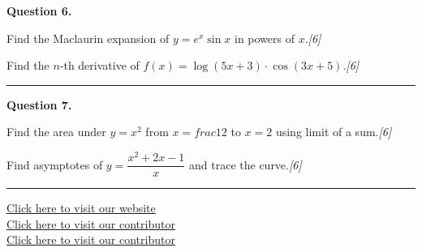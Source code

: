 \documentclass[11pt,a4paper]{article}
\newcommand{\pts}[1]{\hfill   \textit{[#1]}}
\begin{document}
\medskip


\noindent   \textbf{Question 6.}

\begin{parts}
  \item Find the Maclaurin expansion of $y=e^x\sin x$ in powers of $x$.\pts{6}
  \item Find the $n$-th derivative of $f(x)=\log(5x+3)\cdot\cos(3x+5)$.\pts{6}
\end{parts}
\medskip\rule{\linewidth}{0.2pt}

\medskip


\noindent   \textbf{Question 7.}

\begin{parts}
  \item Find the area under $y=x^2$ from $x= frac{1}{2}$ to $x=2$ using limit of a sum.\pts{6}
  \item Find asymptotes of $y=\dfrac{x^2+2x-1}{x}$ and trace the curve.\pts{6}
\end{parts}

\vfill\rule{\linewidth}{0.4pt}

\begin{center}\small
\href{https://bhu-exam.vercel.app/}{Click here to visit our website}\\[4pt]
\href{https://me-aryan.vercel.app/}{Click here to visit our contributor}\\[4pt]
\href{https://quashan-me.vercel.app/}{Click here to visit our contributor}
\end{center}
\end{document}
